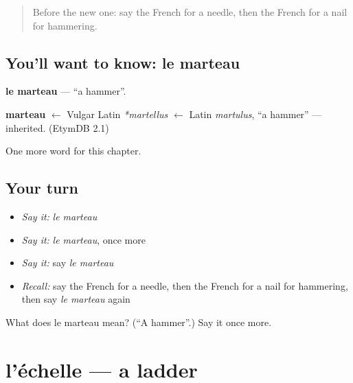 \label{lesson:FR-C230-marteau}



\begin{quote}
Before the new one: say the French for a needle, then the French for a nail for hammering.
\end{quote}

\subsection*{You'll want to know: le marteau}
\textbf{le marteau} — \textquotedblleft{}a hammer\textquotedblright{}.

\begin{cousinweb}
\textbf{marteau} $\leftarrow$ Vulgar Latin \emph{*martellus} $\leftarrow$ Latin \emph{martulus}, \textquotedblleft{}a hammer\textquotedblright{} — inherited. (EtymDB 2.1)
\end{cousinweb}

\begin{grammarlens}[title={What you've built}]
One more word for this chapter.
\end{grammarlens}

\subsection*{Your turn}
\begin{itemize}
\raggedright
  \item \emph{Say it:} \emph{le marteau}
  \item \emph{Say it:} \emph{le marteau}, once more
  \item \emph{Say it:} say \emph{le marteau}
  \item \emph{Recall:} say the French for a needle, then the French for a nail for hammering, then say \emph{le marteau} again
\end{itemize}

\begin{tcolorbox}[breakable,colback=teal!4,colframe=teal!35!black,title={Before you move on}]
What does le marteau mean? (\textquotedblleft{}A hammer\textquotedblright{}.) Say it once more.
\end{tcolorbox}
\section[l'échelle]{l'échelle — a ladder}

\label{lesson:FR-C230-echelle}



